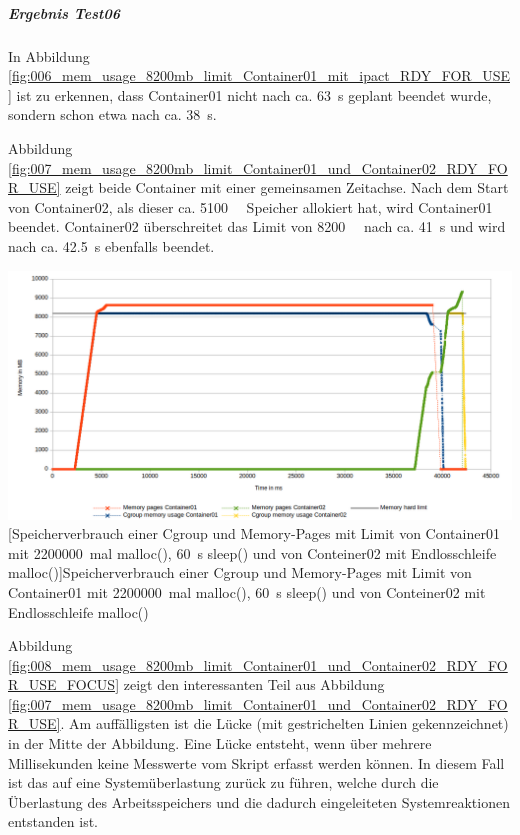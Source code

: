 \subparagraph{Ergebnis Test06}
In Abbildung \ref{fig:006_mem_usage_8200mb_limit_Container01_mit_ipact_RDY_FOR_USE} ist zu erkennen, dass Container01 nicht nach ca. \SI{63}{\second} geplant beendet wurde, sondern schon etwa nach ca. \SI{38}{\second}.

Abbildung \ref{fig:007_mem_usage_8200mb_limit_Container01_und_Container02_RDY_FOR_USE} zeigt beide Container mit einer gemeinsamen Zeitachse. Nach dem Start von Container02, als dieser ca. \SI{5100}{\mega\byte} Speicher allokiert hat, wird Container01 beendet. Container02 überschreitet das Limit von \SI{8200}{\mega\byte} nach ca. \SI{41}{\second} und wird nach ca. \SI{42,5}{\second} ebenfalls beendet.

\vspace{1em}
\begin{minipage}{\linewidth}
	\centering
	\includegraphics[width=1\linewidth]{pics/007_mem_usage_8200mb_limit_Container01_und_Container02_RDY_FOR_USE.png}
	[Speicherverbrauch einer Cgroup und Memory-Pages mit Limit von Container01 mit \SI{2200000}{mal} malloc(), \SI{60}{\second} sleep() und von Conteiner02 mit Endlosschleife malloc()]{Speicherverbrauch einer Cgroup und Memory-Pages mit Limit von Container01 mit \SI{2200000}{mal} malloc(), \SI{60}{\second} sleep() und von Conteiner02 mit Endlosschleife malloc()}
	\label{fig:007_mem_usage_8200mb_limit_Container01_und_Container02_RDY_FOR_USE}
\end{minipage}
\vspace{1em}

Abbildung \ref{fig:008_mem_usage_8200mb_limit_Container01_und_Container02_RDY_FOR_USE_FOCUS} zeigt den interessanten Teil aus Abbildung \ref{fig:007_mem_usage_8200mb_limit_Container01_und_Container02_RDY_FOR_USE}. Am auffälligsten ist die Lücke (mit gestrichelten Linien gekennzeichnet) in der Mitte der Abbildung. Eine Lücke entsteht, wenn über mehrere Millisekunden keine Messwerte vom Skript erfasst werden können. In diesem Fall ist das auf eine Systemüberlastung zurück zu führen, welche durch die Überlastung des Arbeitsspeichers und die dadurch eingeleiteten Systemreaktionen entstanden ist. 

